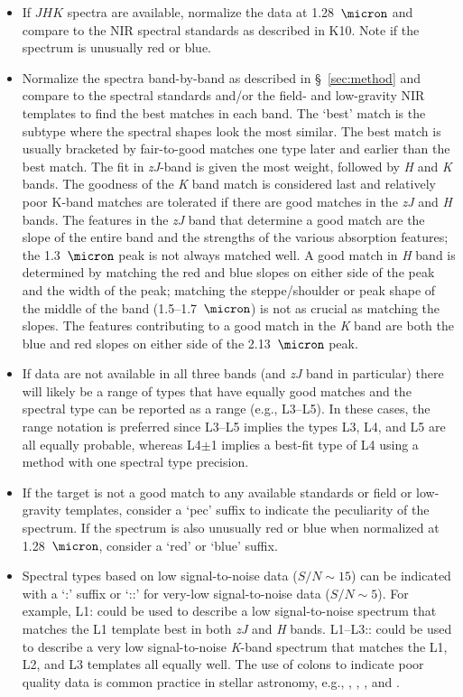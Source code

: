 \documentclass[12pt]{aastex6}
\begin{document}
\begin{itemize}
	\item If $JHK$ spectra are available, normalize the data at 1.28~$\micron$ and compare to the NIR spectral standards as described in K10. Note if the spectrum is unusually red or blue.

	\item Normalize the spectra band-by-band as described in \S~\ref{sec:method} and compare to the spectral standards and/or the field- and low-gravity NIR templates to find the best matches in each band.
	The `best' match is the subtype where the spectral shapes look the most similar. The best match is usually bracketed by fair-to-good matches one type later and earlier than the best match.
	The fit in \emph{zJ}-band is given the most weight, followed by \emph{H} and \emph{K} bands. The goodness of the \emph{K} band match is considered last and relatively poor K-band matches are tolerated if there are good matches in the \emph{zJ} and \emph{H} bands.
	The features in the \emph{zJ} band that determine a good match are the slope of the entire band and the strengths of the various absorption features; the 1.3~$\micron$ peak is not always matched well.
	A good match in \emph{H} band is determined by matching the red and blue slopes on either side of the peak and the width of the peak; matching the steppe/shoulder or peak shape of the middle of the band (1.5--1.7~$\micron$) is not as crucial as matching the slopes.
The features contributing to a good match in the \emph{K} band are both the blue and red slopes on either side of the 2.13~$\micron$ peak.
	\item If data are not available in all three bands (and \emph{zJ} band in particular) there will likely be a range of types that have equally good matches and the spectral type can be reported as a range (e.g., L3--L5). In these cases, the range notation is preferred since L3--L5 implies the types L3, L4, and L5 are all equally probable, whereas L4$\pm$1 implies a best-fit type of L4 using a method with one spectral type precision.
	\item If the target is not a good match to any available standards or field or low-gravity templates, consider a `pec' suffix to indicate the peculiarity of the spectrum. If the spectrum is also unusually red or blue when normalized at 1.28~$\micron$, consider a `red' or `blue' suffix.
	\item Spectral types based on low signal-to-noise data ($S/N\sim15$) can be indicated with a `:' suffix or `::' for very-low signal-to-noise data ($S/N\sim5$).
    For example, L1: could be used to describe a low signal-to-noise spectrum that matches the L1 template best in both \emph{zJ} and \emph{H} bands. L1--L3:: could be used to describe a very low signal-to-noise \emph{K}-band spectrum that matches the L1, L2, and L3 templates all equally well.
	The use of colons to indicate poor quality data is common practice in stellar astronomy, e.g., \citet{Sanduleak:1988fn}, \cite{Silvestri:2006el}, \citet[Table 12.1]{Gray:2009wd}, and \cite{Covey:2010de}.

\end{itemize}
\end{document}

